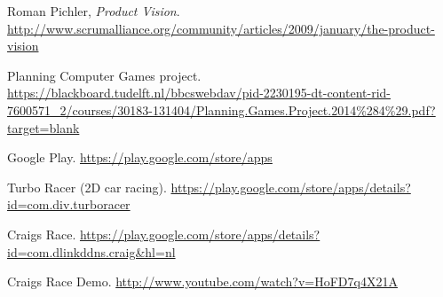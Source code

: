 \documentclass[11pt,twoside,a4paper]{article}
\begin{document}
\clearpage
\begin{thebibliography}{10}

Roman Pichler, \textit{Product Vision}. \url{http://www.scrumalliance.org/community/articles/2009/january/the-product-vision}

Planning Computer Games project. \url{https://blackboard.tudelft.nl/bbcswebdav/pid-2230195-dt-content-rid-7600571_2/courses/30183-131404/Planning.Games.Project.2014%284%29.pdf?target=blank}

Google Play. \url{https://play.google.com/store/apps}

Turbo Racer (2D car racing). \url{https://play.google.com/store/apps/details?id=com.div.turboracer}

Craigs Race. \url{https://play.google.com/store/apps/details?id=com.dlinkddns.craig&hl=nl}

Craigs Race Demo. \url{http://www.youtube.com/watch?v=HoFD7q4X21A}

\end{thebibliography}
\end{document}
